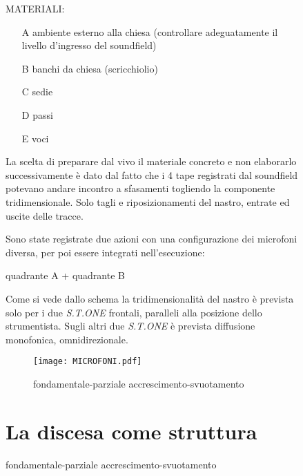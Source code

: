 \begin{figure}
\bigskip

MATERIALI:

\begin{enumerate}
	\item [A] ambiente esterno alla chiesa \newline (controllare adeguatamente il livello d'ingresso del soundfield)
	\item [B] banchi da chiesa (scricchiolio)
	\item [C] sedie
	\item [D] passi
	\item [E] voci
\end{enumerate}

La scelta di preparare  dal vivo il materiale  concreto e non elaborarlo successivamente
è dato dal fatto che i 4 tape registrati dal soundfield potevano andare incontro a
sfasamenti togliendo la componente tridimensionale. Solo tagli e riposizionamenti
del nastro, entrate ed uscite delle tracce.

Sono state registrate due azioni con una configurazione dei microfoni diversa,
per poi essere integrati nell'esecuzione:

\begin{center}
quadrante A + quadrante B
\end{center} 

Come si vede dallo schema la tridimensionalità del nastro è prevista solo per i due
\emph{S.T.ONE} frontali, paralleli alla posizione dello strumentista. Sugli altri due
\emph{S.T.ONE} è prevista diffusione monofonica, omnidirezionale.

\begin{figure}[h]
\centering
{\texttt{[image: MICROFONI.pdf]}}
\caption[Passaggio microtonale]{fondamentale-parziale accrescimento-svuotamento}
\label{fig:microtoni}
\end{figure}

\section{La discesa come struttura}


\end{figure}
